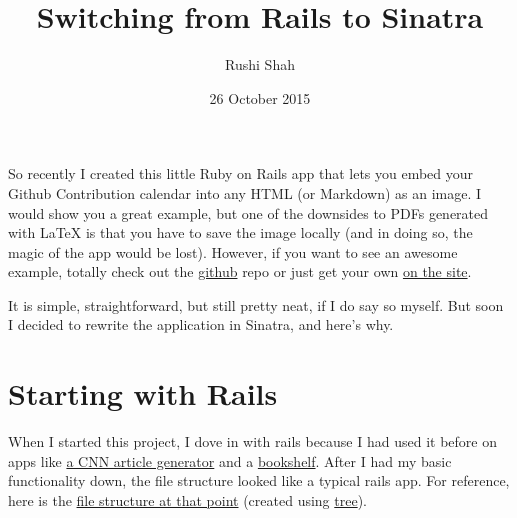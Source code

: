 \documentclass[12pt]{article}
\title{Switching from Rails to Sinatra}
\author{Rushi Shah}
\date{26 October 2015}
\begin{document}
  \maketitle


So recently I created this little Ruby on Rails app that lets you embed
your Github Contribution calendar into any HTML (or Markdown) as an
image. I would show you a great example, but one of the downsides to PDFs generated with LaTeX is that you have to save the image locally (and in doing so, the magic of the app would be lost). 
However, if you want to see an awesome example, totally check out the
\href{https://github.com/2016rshah/githubchart-api}{github} repo or just get your own \href{http://ghchart.rshah.org/}{on the site}.

It is simple, straightforward, but still pretty neat, if I do say so
myself. But soon I decided to rewrite the application in Sinatra, and
here's why.

\section{Starting with Rails}\label{starting-with-rails}

When I started this project, I dove in with rails because I had used it
before on apps like \href{https://github.com/2016rshah/article-generator}{a CNN article generator} and a
\href{https://github.com/2016rshah/bookshelf}{bookshelf}. After I had my basic functionality down, the file
structure looked like a typical rails app. For reference, here is the
\href{https://github.com/2016rshah/githubchart-api/tree/bb813c46188d24a7eb620b69c2a4f07baacc505f}{file
structure at that point} (created using
\href{http://mama.indstate.edu/users/ice/tree/}{tree}).
\end{document}
